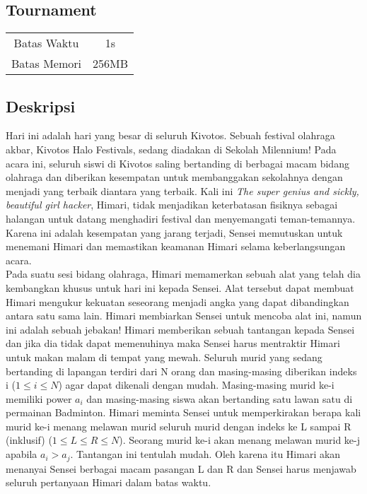 \documentclass{article}
\begin{document}
\begin{center}

    
    \section*{Tournament} %

    \begin{tabular}{ | c c | }
        \hline
        Batas Waktu  & 1s \\    %
        Batas Memori & 256MB \\  %
        \hline
    \end{tabular}
\end{center}

\subsection*{Deskripsi}

Hari ini adalah hari yang besar di seluruh Kivotos. Sebuah festival olahraga akbar, Kivotos Halo Festivals, sedang diadakan di Sekolah Milennium! Pada acara ini, seluruh siswi di Kivotos saling bertanding di berbagai macam bidang olahraga dan diberikan kesempatan untuk membanggakan sekolahnya dengan menjadi yang terbaik diantara yang terbaik. Kali ini \textit{The super genius and sickly, beautiful girl hacker}, Himari, tidak menjadikan keterbatasan fisiknya sebagai halangan untuk datang menghadiri festival dan menyemangati teman-temannya. Karena ini adalah kesempatan yang jarang terjadi, Sensei memutuskan untuk menemani Himari dan memastikan keamanan Himari selama keberlangsungan acara.\\

Pada suatu sesi bidang olahraga, Himari memamerkan sebuah alat yang telah dia kembangkan khusus untuk hari ini kepada Sensei. Alat tersebut dapat membuat Himari mengukur kekuatan seseorang menjadi angka yang dapat dibandingkan antara satu sama lain. Himari membiarkan Sensei untuk mencoba alat ini, namun ini adalah sebuah jebakan! Himari memberikan sebuah tantangan kepada Sensei dan jika dia tidak dapat memenuhinya maka Sensei harus mentraktir Himari untuk makan malam di tempat yang mewah. Seluruh murid yang sedang bertanding di lapangan terdiri dari N orang dan masing-masing diberikan indeks i ($1 \leq i \leq N$) agar dapat dikenali dengan mudah. Masing-masing murid ke-i memiliki power $a_i$ dan masing-masing siswa akan bertanding satu lawan satu di permainan Badminton. Himari meminta Sensei untuk memperkirakan berapa kali murid ke-i menang melawan murid seluruh murid dengan indeks ke L sampai R (inklusif) ($1 \leq L \leq R \leq N$). Seorang murid ke-i akan menang melawan murid ke-j apabila $a_i > a_j$. Tantangan ini tentulah mudah. Oleh karena itu Himari akan menanyai Sensei berbagai macam pasangan L dan R dan Sensei harus menjawab seluruh pertanyaan Himari dalam batas waktu.\\
\end{document}
